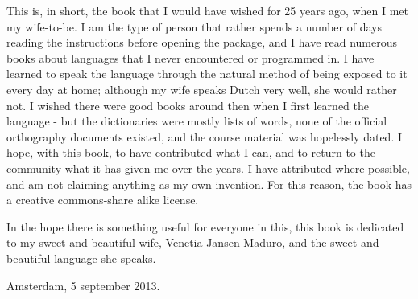 This is, in short, the book that I would have wished for 25 years ago,
when I met my wife-to-be. I am the type of person that rather spends a
number of days reading the instructions before opening the package,
and I have read numerous books about languages that I never
encountered or programmed in. I have learned to speak the language
through the natural method of being exposed to it every day at home;
although my wife speaks Dutch very well, she would rather not. I wished there were good books around then when I first learned the language - but the dictionaries were mostly lists of words, none of the official orthography documents existed, and the course material was hopelessly dated. I hope, with this book, to have contributed what I can, and to return to the community what it has given me over the years. I have attributed where possible, and am not claiming anything as my own invention. For this reason, the book has a creative commons-share alike license.

In the hope there is something useful for everyone in this, this book is dedicated to my sweet and beautiful wife, Venetia Jansen-Maduro, and the sweet and beautiful language she speaks.

Amsterdam, 5 september 2013.
